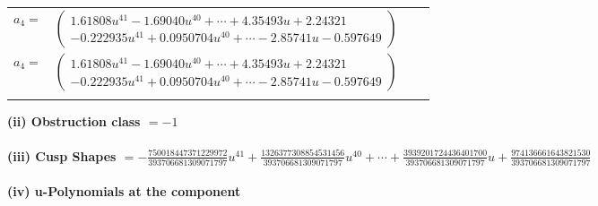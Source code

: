 \documentclass[1p]{elsarticle_modified}
\theoremstyle{definition}
\begin{document}
\begin{tabular}{m{7pt} m{180pt} m{7pt} m{180pt} }
\flushright $a_{4}=$&$\begin{pmatrix}1.61808 u^{41}-1.69040 u^{40}+\cdots+4.35493 u+2.24321\\-0.222935 u^{41}+0.0950704 u^{40}+\cdots-2.85741 u-0.597649\end{pmatrix}$\\ \flushright $a_{4}=$&$\begin{pmatrix}1.61808 u^{41}-1.69040 u^{40}+\cdots+4.35493 u+2.24321\\-0.222935 u^{41}+0.0950704 u^{40}+\cdots-2.85741 u-0.597649\end{pmatrix}$\\&\end{tabular}
\flushleft \textbf{(ii) Obstruction class $= -1$}\\~\\
\flushleft \textbf{(iii) Cusp Shapes $= -\frac{750018447371229972}{393706681309071797} u^{41}+\frac{1326377308854531456}{393706681309071797} u^{40}+\cdots+\frac{3939201724436401700}{393706681309071797} u+\frac{974136661643821530}{393706681309071797}$}\\~\\
\newpage\renewcommand{\arraystretch}{1}
\flushleft \textbf{(iv) u-Polynomials at the component}\newline \\
\end{document}
